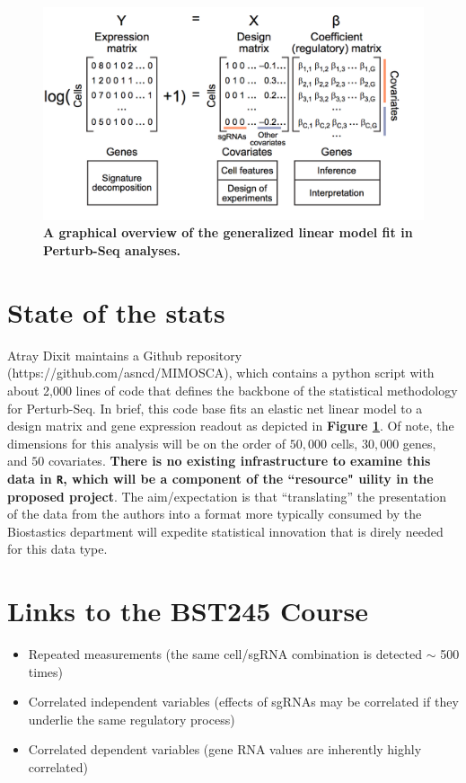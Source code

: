 \documentclass{article}\usepackage[]{graphicx}\usepackage[]{color}
\begin{document}
\label{fig:model} 

\begin{figure}[ht]
    \centering
    \includegraphics[width=\textwidth]{model.png}
    \caption{\textbf{A graphical overview of the generalized linear model fit in Perturb-Seq analyses.}}
     \label{fig:model}
\end{figure}


\section*{State of the stats}
Atray Dixit maintains a Github repository (https://github.com/asncd/MIMOSCA), which contains a python script with about 2,000 lines of code that defines the backbone of the statistical methodology for Perturb-Seq. In brief, this code base fits an elastic net linear model to a design matrix and gene expression readout as depicted in \textbf{Figure \ref{fig:model}}. Of note, the dimensions for this analysis will be on the order of $50,000$ cells, $30,000$ genes, and $50$ covariates. \textbf{There is no existing infrastructure to examine this data in \texttt{R}, which will be a component of the ``resource" uility in the proposed project}. The aim/expectation is that ``translating'' the presentation of the data from the authors into a format more typically consumed by the Biostastics department will expedite statistical innovation that is direly needed for this data type. 

\section*{Links to the BST245 Course}
\begin{itemize}
  \item Repeated measurements (the same cell/sgRNA combination is detected $\sim$ 500 times)
  \item Correlated independent variables (effects of sgRNAs may be correlated if they underlie the same regulatory process)
  \item Correlated dependent variables (gene RNA values are inherently highly correlated)
\end{itemize}
\end{document}
